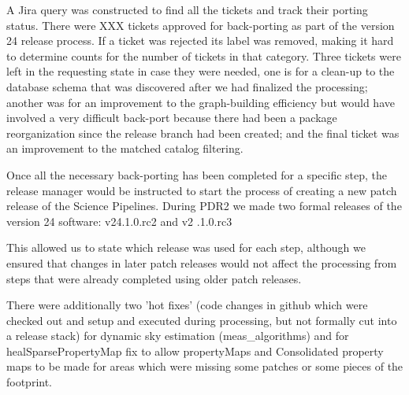 A Jira query was constructed to find all the tickets and track their porting status.
There were XXX tickets approved for back-porting as part of the version 24 release process.
If a ticket was rejected its label was removed, making it hard to determine counts for the number of tickets in that category.
Three tickets were left in the requesting state in case they were needed, one is for a clean-up to the database schema that was discovered after we had finalized the processing; another was for an improvement to the graph-building efficiency but would have involved a very difficult back-port because there had been a package reorganization since the release branch had been created; and the final ticket was an improvement to the matched catalog filtering.

Once all the necessary back-porting has been completed for a specific step, the release manager would be instructed to start the process of creating a new patch release of the Science Pipelines.
During PDR2 we made two formal releases of the version 24 software: v24.1.0.rc2 and v2 .1.0.rc3

This allowed us to state which release was used for each step, although we ensured that changes in later patch releases would not affect the processing from steps that were already completed using older patch releases.

There were additionally two 'hot fixes' (code changes in github which were
checked out and setup and executed during processing, but not formally
cut into a release stack)
for dynamic sky estimation (meas\_algorithms)
and for healSparsePropertyMap fix to allow propertyMaps and Consolidated property maps to be made for areas which were missing some patches or some pieces
of the footprint.

